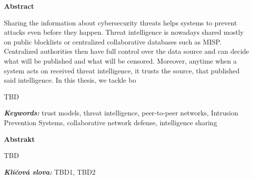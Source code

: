 \newenvironment{abstractpage}
  {\cleardoublepage\thispagestyle{empty}}
  {\vfill\cleardoublepage}
\newenvironment{abstract}[1]
  {\bigskip
   \begin{center}\bfseries#1\end{center}\small\leftskip=0.5cm\rightskip=0.5cm}
  {\par\bigskip}

\providecommand{\keywords}[2]{\footnotesize\textbf{\textit{#1:}} #2}

\begin{abstractpage}
\begin{abstract}{Abstract}
Sharing the information about cybersecurity threats helps systems to prevent attacks even before they happen.
Threat intelligence is nowadays shared mostly on public blocklists or centralized collaborative databases such as MISP.
Centralized authorities then have full control over the data source and can decide what will be published and what will be censored.
Moreover, anytime when a system acts on received threat intelligence, it trusts the source, that published said intelligence.
In this thesis, we tackle bo

TBD 
\end{abstract}

\keywords{Keywords}{trust models, threat intelligence, peer-to-peer networks, Intrusion Prevention Systems, collaborative network defense, intelligence sharing}

\vspace*{\fill}

\begin{abstract}{Abstrakt}
    TBD 
    
\end{abstract}
\keywords{Klíčová slova}{TBD1, TBD2} 

\end{abstractpage}
\thispagestyle{empty}

\cleardoublepage